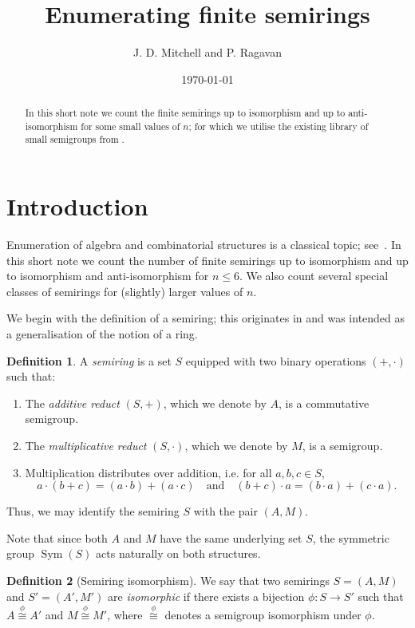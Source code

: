 \documentclass{article}
\title{Enumerating finite semirings}
\author{J. D. Mitchell and P. Ragavan}
\date{\today}
\theoremstyle{definition}
\newtheorem{defn}{Definition}[section]
\theoremstyle{plain}
\begin{document}
\maketitle

\begin{abstract}
  In this short note we count the finite semirings up to isomorphism
  and up to anti-isomorphism for some small values of $n$; for which we
  utilise the existing library of small semigroups from \cite{}.
\end{abstract}

\section{Introduction}

Enumeration of
algebra and combinatorial structures is a classical topic;
see~\cite{MilleniumProject, Smallsemi, graphs, digraphs, rings, etc}.
In this short note we count the number of finite semirings up to isomorphism
and up to isomorphism and anti-isomorphism for $n \leq 6$. We also count
several special classes of semirings for (slightly) larger values of $n$.

We begin with the definition of a semiring; this originates in
\cite{} and was intended as a generalisation of the notion of a ring.

\begin{defn}
  \label{def:semiring}
  A \emph{semiring} is a set \(S\) equipped with two binary
  operations \((+, \cdot)\) such that:
  \begin{enumerate}
    \item The \emph{additive reduct} \((S, +)\), which we denote by
      \(A\), is a commutative semigroup.
    \item The \emph{multiplicative reduct} \((S, \cdot)\), which we
      denote by \(M\), is a semigroup.
    \item Multiplication distributes over addition, i.e. for all \(a,
      b, c \in S\),
      \[
        a \cdot (b + c) = (a \cdot b) + (a \cdot c) \quad \text{and}
        \quad (b + c) \cdot a = (b \cdot a) + (c \cdot a).
      \]
  \end{enumerate}
  Thus, we may identify the semiring \(S\) with the pair \((A, M)\).
\end{defn}

Note that since both \(A\) and \(M\) have the same underlying set
\(S\), the symmetric group \(\operatorname{Sym}(S)\) acts naturally
on both structures.

\begin{defn}[Semiring isomorphism]
  We say that two semirings \(S = (A, M)\) and \(S' = (A', M')\) are
  \emph{isomorphic} if there exists a bijection \(\phi: S \to S'\)
  such that \(A \overset{\phi}\cong A'\) and \(M \overset{\phi}\cong
  M'\), where \(\overset{\phi}\cong\) denotes a semigroup isomorphism
  under \(\phi\).
\end{defn}
\end{document}
